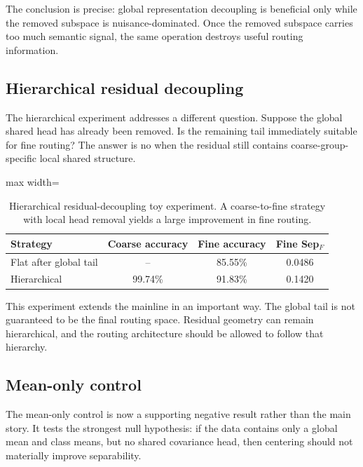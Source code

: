 \documentclass[11pt]{article}
\newcommand{\tablesize}{\footnotesize}
\begin{document}
The conclusion is precise: global representation decoupling is beneficial only while the removed subspace is nuisance-dominated. Once the removed subspace carries too much semantic signal, the same operation destroys useful routing information.

\subsection{Hierarchical residual decoupling}

The hierarchical experiment addresses a different question. Suppose the global shared head has already been removed. Is the remaining tail immediately suitable for fine routing? The answer is no when the residual still contains coarse-group-specific local shared structure.

\begin{table}[H]
\centering
\tablesize
\begin{adjustbox}{max width=\linewidth}
\begin{tabular}{lccc}
\toprule
Strategy & Coarse accuracy & Fine accuracy & Fine Sep$_F$ \\
\midrule
Flat after global tail & -- & 85.55\% & 0.0486 \\
Hierarchical & 99.74\% & 91.83\% & 0.1420 \\
\bottomrule
\end{tabular}
\end{adjustbox}
\caption{Hierarchical residual-decoupling toy experiment. A coarse-to-fine strategy with local head removal yields a large improvement in fine routing.}
\label{tab:hierarchical}
\end{table}

This experiment extends the mainline in an important way. The global tail is not guaranteed to be the final routing space. Residual geometry can remain hierarchical, and the routing architecture should be allowed to follow that hierarchy.

\subsection{Mean-only control}

The mean-only control is now a supporting negative result rather than the main story. It tests the strongest null hypothesis: if the data contains only a global mean and class means, but no shared covariance head, then centering should not materially improve separability.
\end{document}
